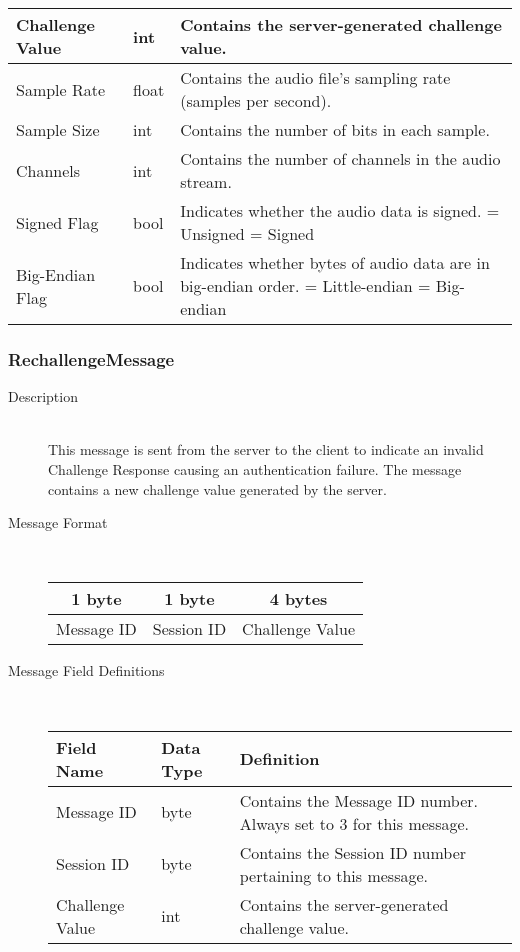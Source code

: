 \documentclass[12pt,letterpaper,titlepage]{article}
\begin{document}
\begin{description}
\begin{tabular}{ | p{3cm} | p{1.5cm} | p{8cm} | }
		\hline
		Challenge Value & int & Contains the server-generated challenge value.  \\
		\hline
		Sample Rate & float & Contains the audio file's sampling rate (samples per second).  \\
		\hline
		Sample Size & int & Contains the number of bits in each sample.  \\
		\hline
		Channels & int & Contains the number of channels in the audio stream.  \\
		\hline
		Signed Flag & bool & Indicates whether the audio data is signed. 
						\newline 0 = Unsigned
						\newline 1 = Signed \\
		\hline
		Big-Endian Flag & bool & Indicates whether bytes of audio data are in big-endian order. 
						\newline 0 = Little-endian
						\newline 1 = Big-endian \\
		\hline
	\end{tabular}
	\end{description}
\subsubsection{RechallengeMessage}
	\begin{description}
	\item[Description] \hfill \\
		This message is sent from the server to the client to indicate an invalid Challenge Response 
		causing an authentication failure.  The message contains a new challenge value generated by the server.
	\item[Message Format] \hfill \\
	\begin{tabular}{ | c | c | c | }
		\hline
		1 byte & 1 byte & 4 bytes \\
		\hline
		Message ID & Session ID &  Challenge Value \\
		\hline
	\end{tabular}
	\item[Message Field Definitions] \hfill \\
	\begin{tabular}{ | p{3cm} | p{1.5cm} | p{8cm} | }
		\hline
		Field Name & Data Type & Definition \\
		\hline
		Message ID & byte & Contains the Message ID number. 
					\newline Always set to 3 for this message. \\
		\hline
		Session ID & byte & Contains the Session ID number pertaining to this message. \\
		\hline
		Challenge Value & int & Contains the server-generated challenge value. \\
		\hline
	\end{tabular}
	\end{description}
\end{document}
